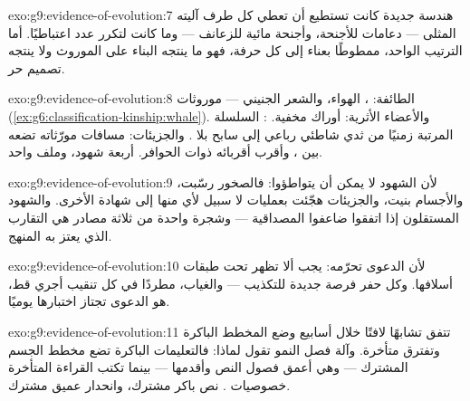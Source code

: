 \begin{solution}{exo:g9:evidence-of-evolution:7}
هندسة جديدة كانت تستطيع أن تعطي كل طرف آليته المثلى ---
دعامات للأجنحة، وأجنحة مائية للزعانف --- وما كانت لتكرر
عدد  اعتباطيًا. أما الترتيب الواحد، ممطوطًا بعناء
إلى كل حرفة، فهو ما ينتجه البناء على الموروث ولا ينتجه
تصميم حر.
\end{solution}

\begin{solution}{exo:g9:evidence-of-evolution:8}
الطائفة: ،  الهواء، والشعر الجنيني ---
موروثات 
(\cref{ex:g6:classification-kinship:whale}). والأعضاء
الأثرية: أوراك   مخفية. : السلسلة
المرتبة زمنيًا من ثدي شاطئي رباعي  إلى سابح بلا
. والجزيئات: مسافات مورّثاته تضعه بين ،
وأقرب أقربائه ذوات الحوافر. أربعة شهود، وملف واحد.
\end{solution}

\begin{solution}{exo:g9:evidence-of-evolution:9}
لأن الشهود لا يمكن أن يتواطؤوا: فالصخور رسّبت، والأجسام
بنيت، والجزيئات هجّئت بعمليات لا سبيل لأي منها إلى شهادة
الأخرى. والشهود المستقلون إذا اتفقوا ضاعفوا المصداقية
--- وشجرة واحدة من ثلاثة مصادر هي التقارب الذي يعتز به
المنهج.
\end{solution}

\begin{solution}{exo:g9:evidence-of-evolution:10}
لأن الدعوى تحرّمه:  يجب ألا تظهر تحت طبقات
أسلافها. وكل حفر فرصة جديدة للتكذيب --- والغياب، مطردًا
في كل تنقيب أجري قط، هو الدعوى تجتاز اختبارها يوميًا.
\end{solution}

\begin{solution}{exo:g9:evidence-of-evolution:11}
  تتفق تشابهًا لافتًا خلال أسابيع وضع المخطط
الباكرة وتفترق متأخرة. وآلة فصل النمو تقول لماذا:
فالتعليمات الباكرة تضع مخطط الجسم المشترك --- وهي أعمق
فصول النص وأقدمها --- بينما تكتب القراءة المتأخرة
خصوصيات . نص باكر مشترك، وانحدار عميق مشترك.
\end{solution}

